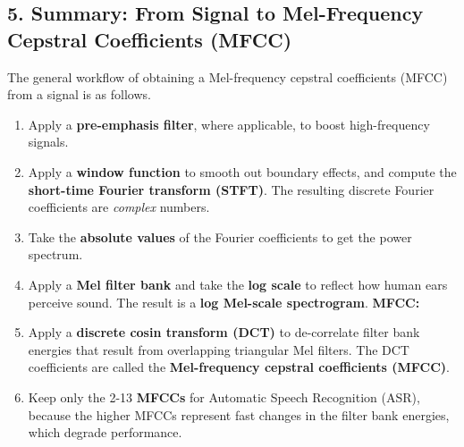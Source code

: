 \documentclass[11pt]{article}
\makeatletter
\providecommand{\tightlist}{%
      \setlength{\itemsep}{0pt}\setlength{\parskip}{0pt}}
\newcommand{\boxspacing}{\kern\kvtcb@left@rule\kern\kvtcb@boxsep}
\newcommand{\prompt}[4]{
        {\ttfamily\llap{{\color{#2}[#3]:\hspace{3pt}#4}}\vspace{-\baselineskip}}
    }
\makeatother
\begin{document}
    \hypertarget{summary-from-signal-to-mel-frequency-cepstral-coefficients-mfcc}{%
\subsection{5. Summary: From Signal to Mel-Frequency Cepstral
Coefficients
(MFCC)}\label{summary-from-signal-to-mel-frequency-cepstral-coefficients-mfcc}}

The general workflow of obtaining a Mel-frequency cepstral coefficients
(MFCC) from a signal is as follows.

\begin{enumerate}
\def\labelenumi{\arabic{enumi}.}
\setcounter{enumi}{-1}
\tightlist
\item
  Apply a \textbf{pre-emphasis filter}, where applicable, to boost
  high-frequency signals.
\item
  Apply a \textbf{window function} to smooth out boundary effects, and
  compute the \textbf{short-time Fourier transform (STFT)}. The
  resulting discrete Fourier coefficients are \emph{complex} numbers.
\item
  Take the \textbf{absolute values} of the Fourier coefficients to get
  the power spectrum.
\item
  Apply a \textbf{Mel filter bank} and take the \textbf{log scale} to
  reflect how human ears perceive sound. The result is a \textbf{log
  Mel-scale spectrogram}. \textbf{MFCC:}
\item
  Apply a \textbf{discrete cosin transform (DCT)} to de-correlate filter
  bank energies that result from overlapping triangular Mel filters. The
  DCT coefficients are called the \textbf{Mel-frequency cepstral
  coefficients (MFCC)}.
\item
  Keep only the 2-13 \textbf{MFCCs} for Automatic Speech Recognition
  (ASR), because the higher MFCCs represent fast changes in the filter
  bank energies, which degrade performance.
\end{enumerate}

    \begin{tcolorbox}[breakable, size=fbox, boxrule=1pt, pad at break*=1mm,colback=cellbackground, colframe=cellborder]
\prompt{In}{incolor}{ }{\boxspacing}
\begin{Verbatim}[commandchars=\\\{\}]

\end{Verbatim}
\end{tcolorbox}

    \begin{tcolorbox}[breakable, size=fbox, boxrule=1pt, pad at break*=1mm,colback=cellbackground, colframe=cellborder]
\prompt{In}{incolor}{ }{\boxspacing}
\begin{Verbatim}[commandchars=\\\{\}]

\end{Verbatim}
\end{tcolorbox}
\end{document}
